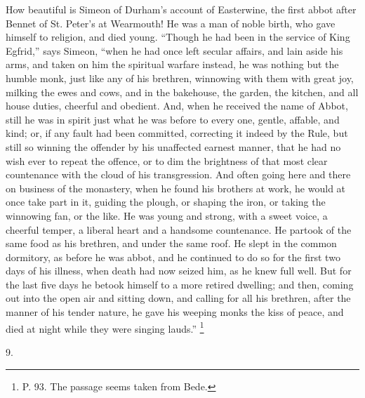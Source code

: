 How beautiful is Simeon of Durham's account of Easterwine, the
first abbot after Bennet of St. Peter's at Wearmouth! He was a man of
noble birth, who gave himself to religion, and died young.
``Though he had been in the service of King Egfrid,'' says
Simeon, ``when he had once left secular affairs, and lain aside
his arms, and taken on him the spiritual warfare instead, he was
nothing but the humble monk, just like any of his brethren, winnowing
with them with great joy, milking the ewes and cows, and in the
bakehouse, the garden, the kitchen, and all house duties, cheerful and
obedient. And, when he received the name of Abbot, still he was in
spirit just what he was before to every one, gentle, affable, and
kind; or, if any fault had been committed, correcting it indeed by the
Rule, but still so winning the offender by his unaffected earnest
manner, that he had no wish ever to repeat the offence, or to dim the
brightness of that most clear countenance with the cloud of his
transgression. And often going here and there on business of the
monastery, when he found his brothers at work, he would at once take
part in it, guiding the plough, or shaping the iron, or taking the
winnowing fan, or the like. He was young and strong, with a sweet
voice, a cheerful temper, a liberal heart and a handsome countenance.
He partook of the same food as his brethren, and under the same roof.
He slept in the common dormitory, as before he was abbot, and he
continued to do so for the first two days of his illness, when death
had now seized him, as he knew full well. But for the last five days
he betook himself to a more retired dwelling; and then, coming out
into the open air and sitting down, and calling for all his brethren,
after the manner of his tender nature, he gave his weeping monks the
kiss of peace, and died at night while they were singing lauds.''
\footnote{P. 93. The
passage seems taken from Bede.}

9.

